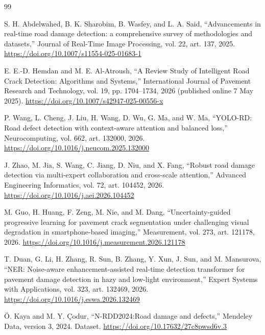 \documentclass[11pt,a4paper]{article}
\begin{document}
\begingroup
\small
\raggedright
\begin{thebibliography}{99}
\setlength{\itemsep}{6pt}
\setlength{\parskip}{0pt}

 S. H. Abdelwahed, B. K. Sharobim, B. Wasfey, and L. A. Said, ``Advancements in real-time road damage detection: a comprehensive survey of methodologies and datasets,'' Journal of Real-Time Image Processing, vol. 22, art. 137, 2025. \url{https://doi.org/10.1007/s11554-025-01683-1}

 E. E.-D. Hemdan and M. E. Al-Atroush, ``A Review Study of Intelligent Road Crack Detection: Algorithms and Systems,'' International Journal of Pavement Research and Technology, vol. 19, pp. 1704--1734, 2026 (published online 7 May 2025). \url{https://doi.org/10.1007/s42947-025-00556-x}

 P. Wang, L. Cheng, J. Liu, H. Wang, D. Wu, G. Ma, and W. Ma, ``YOLO-RD: Road defect detection with context-aware attention and balanced loss,'' Neurocomputing, vol. 662, art. 132000, 2026. \url{https://doi.org/10.1016/j.neucom.2025.132000}

 J. Zhao, M. Jia, S. Wang, C. Jiang, D. Niu, and X. Fang, ``Robust road damage detection via multi-expert collaboration and cross-scale attention,'' Advanced Engineering Informatics, vol. 72, art. 104452, 2026. \url{https://doi.org/10.1016/j.aei.2026.104452}

 M. Guo, H. Huang, F. Zeng, M. Nie, and M. Dang, ``Uncertainty-guided progressive learning for pavement crack segmentation under challenging visual degradation in smartphone-based imaging,'' Measurement, vol. 273, art. 121178, 2026. \url{https://doi.org/10.1016/j.measurement.2026.121178}

 T. Duan, G. Li, H. Zhang, R. Sun, B. Zhang, Y. Xun, J. Sun, and M. Mansurova, ``NER: Noise-aware enhancement-assisted real-time detection transformer for pavement damage detection in hazy and low-light environment,'' Expert Systems with Applications, vol. 323, art. 132469, 2026. \url{https://doi.org/10.1016/j.eswa.2026.132469}

 Ö. Kaya and M. Y. Çodur, ``N-RDD2024:Road damage and defects,'' Mendeley Data, version 3, 2024. Dataset. \url{https://doi.org/10.17632/27c8pwsd6v.3}


\end{thebibliography}
\end{document}
